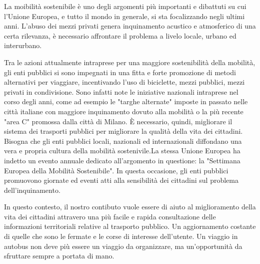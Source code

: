 La moibilit\`{a} sostenibile \`{e} uno degli argomenti pi\`{u} importanti e dibattuti su cui l'Unione Europea, e tutto il mondo in generale, si sta focalizzando negli ultimi anni. L'abuso dei mezzi privati genera inquinamento acustico e atmosferico di una certa rilevanza, \`{e} necessario affrontare il problema a livelo locale, urbano ed interurbano. 

Tra le azioni attualmente intraprese per una maggiore sostenibilità della mobilità, gli enti pubblici si sono impegnati in una fitta e forte promozione di metodi alternativi per viaggiare, incentivando l'uso di biciclette, mezzi pubblici, mezzi privati in condivisione. Sono infatti note le iniziative nazionali intraprese nel corso degli anni, come ad esempio le "targhe alternate" imposte in passato nelle citt\`{a} italiane con maggiore inquinamento dovuto alla mobilità o la più recente "area C" promossa dalla città di Milano. \`{E} necessario, quindi, migliorare il sistema dei trasporti pubblici per migliorare la qualità della vita dei cittadini. Bisogna che gli enti pubblici locali, nazionali ed internazionali diffondano una vera e propria cultura della mobilità sostenivile.La stessa Unione Europea ha indetto un evento annuale dedicato all'argomento in questione: la "Settimana Europea della Mobilità Sostenibile". In questa occasione, gli enti pubblici promuovono giornate ed eventi atti alla sensibilit\`{a} dei cittadini sul problema dell'inquinamento.

In questo contesto, il nostro contibuto vuole essere di aiuto al miglioramento della vita dei cittadini attravero una più facile e rapida consultazione delle informazioni territoriali relative al trasporto pubblico. Un aggiornamento costante di quelle che sono le fermate e le corse di interesse dell'utente. Un viaggio in autobus non deve più essere un viaggio da organizzare, ma un'opportunità da sfruttare sempre a portata di mano. 